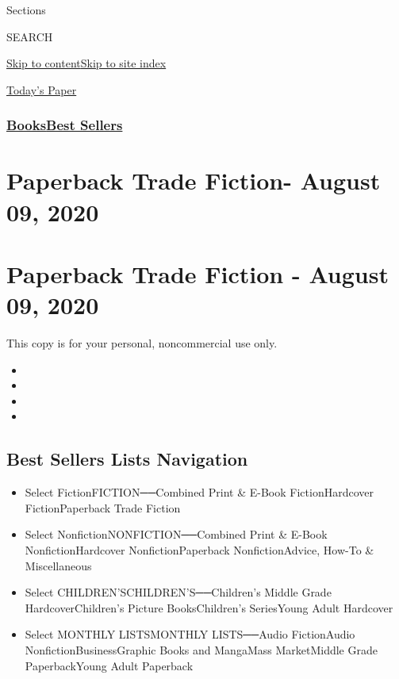 Sections

SEARCH

\protect\hyperlink{site-content}{Skip to
content}\protect\hyperlink{site-index}{Skip to site index}

\href{https://myaccount.nytimes3xbfgragh.onion/auth/login?response_type=cookie\&client_id=vi}{}

\href{https://www.nytimes3xbfgragh.onion/section/todayspaper}{Today's
Paper}

\hypertarget{booksbest-sellers}{%
\subsubsection{\texorpdfstring{\href{/section/books/}{Books}\textbar{}\href{/books/best-sellers/}{Best
Sellers}}{Books\textbar{}Best Sellers}}\label{booksbest-sellers}}

\hypertarget{paperback-trade-fiction--august-09-2020}{%
\section{Paperback Trade Fiction- August 09,
2020}\label{paperback-trade-fiction--august-09-2020}}

\hypertarget{paperback-trade-fiction---august-09-2020}{%
\section{Paperback Trade Fiction - August 09,
2020}\label{paperback-trade-fiction---august-09-2020}}

This copy is for your personal, noncommercial use only.

\begin{itemize}
\item
\item
\item
\item
\end{itemize}

\hypertarget{best-sellers-lists-navigation}{%
\subsection{Best Sellers Lists
Navigation}\label{best-sellers-lists-navigation}}

\begin{itemize}
\tightlist
\item
  Select FictionFICTION──Combined Print \& E-Book FictionHardcover
  FictionPaperback Trade Fiction
\item
  Select NonfictionNONFICTION──Combined Print \& E-Book
  NonfictionHardcover NonfictionPaperback NonfictionAdvice, How-To \&
  Miscellaneous
\item
  Select CHILDREN'SCHILDREN'S──Children's Middle Grade
  HardcoverChildren's Picture BooksChildren's SeriesYoung Adult
  Hardcover
\item
  Select MONTHLY LISTSMONTHLY LISTS──Audio FictionAudio
  NonfictionBusinessGraphic Books and MangaMass MarketMiddle Grade
  PaperbackYoung Adult Paperback
\end{itemize}

